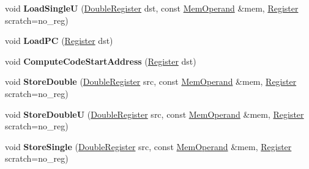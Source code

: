 \begin{DoxyCompactItemize}
\item 
\mbox{\label{classv8_1_1internal_1_1TurboAssembler_af1352f2a24963b864eec74b8f82d6bcf}} 
void {\bfseries Load\+SingleU} (\mbox{\hyperlink{classv8_1_1internal_1_1DoubleRegister}{Double\+Register}} dst, const \mbox{\hyperlink{classv8_1_1internal_1_1MemOperand}{Mem\+Operand}} \&mem, \mbox{\hyperlink{classv8_1_1internal_1_1Register}{Register}} scratch=no\+\_\+reg)
\item 
\mbox{\label{classv8_1_1internal_1_1TurboAssembler_ab5cfd4e5da0edd74cec945e3da817167}} 
void {\bfseries Load\+PC} (\mbox{\hyperlink{classv8_1_1internal_1_1Register}{Register}} dst)
\item 
\mbox{\label{classv8_1_1internal_1_1TurboAssembler_afa16b0e3be91d3616e9f613b954621dd}} 
void {\bfseries Compute\+Code\+Start\+Address} (\mbox{\hyperlink{classv8_1_1internal_1_1Register}{Register}} dst)
\item 
\mbox{\label{classv8_1_1internal_1_1TurboAssembler_aa1ce15d12c788f22d861f3fda7d66e32}} 
void {\bfseries Store\+Double} (\mbox{\hyperlink{classv8_1_1internal_1_1DoubleRegister}{Double\+Register}} src, const \mbox{\hyperlink{classv8_1_1internal_1_1MemOperand}{Mem\+Operand}} \&mem, \mbox{\hyperlink{classv8_1_1internal_1_1Register}{Register}} scratch=no\+\_\+reg)
\item 
\mbox{\label{classv8_1_1internal_1_1TurboAssembler_ab3f001664c887fb788c6835abc44d699}} 
void {\bfseries Store\+DoubleU} (\mbox{\hyperlink{classv8_1_1internal_1_1DoubleRegister}{Double\+Register}} src, const \mbox{\hyperlink{classv8_1_1internal_1_1MemOperand}{Mem\+Operand}} \&mem, \mbox{\hyperlink{classv8_1_1internal_1_1Register}{Register}} scratch=no\+\_\+reg)
\item 
\mbox{\label{classv8_1_1internal_1_1TurboAssembler_a9d596b8743a8324b82b671b8d4d46619}} 
void {\bfseries Store\+Single} (\mbox{\hyperlink{classv8_1_1internal_1_1DoubleRegister}{Double\+Register}} src, const \mbox{\hyperlink{classv8_1_1internal_1_1MemOperand}{Mem\+Operand}} \&mem, \mbox{\hyperlink{classv8_1_1internal_1_1Register}{Register}} scratch=no\+\_\+reg)

\end{DoxyCompactItemize}
